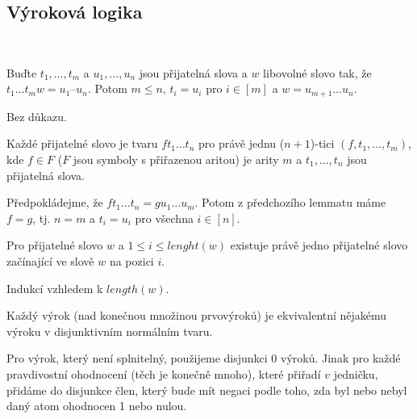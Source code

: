 \documentclass[12pt]{article}                   %
\begin{document}
    \subsection{Výroková logika}
        \begin{lemma}
            \ \\[-3em]

            \begin{lemmain}
                Buďte $t_1, …, t_m$ a $u_1, …, u_n$ jsou přijatelná slova a $w$ libovolné slovo tak, že $t_1…t_mw=u_1–u_n$. Potom $m ≤ n$, $t_i = u_i$ pro $i \in [m]$ a $w = u_{m+1}…u_n$.

                \begin{dukazin}
                    Bez důkazu.
                \end{dukazin}
            \end{lemmain}

            Každé přijatelné slovo je tvaru $ft_1…t_n$ pro právě jednu ($n+1$)-tici $(f, t_1, …, t_m)$, kde $f \in F$ ($F$ jsou symboly s přiřazenou aritou) je arity $m$ a $t_1, …, t_n$ jsou přijatelná slova.

            \begin{dukazin}
                Předpokládejme, že $ft_1…t_n = gu_1…u_m$. Potom z předchozího lemmatu máme $f = g$, tj. $n = m$ a $t_i = u_i$ pro všechna $i \in [n]$.
            \end{dukazin}

            \begin{lemmain}
                Pro přijatelné slovo $w$ a $1≤i≤lenght(w)$ existuje právě jedno přijatelné slovo začínající ve slově $w$ na pozici $i$.

                \begin{dukazin}
                    Indukcí vzhledem k $length(w)$.
                \end{dukazin}
            \end{lemmain}
        \end{lemma}

        \begin{tvrzeni}
            Každý výrok (nad konečnou množinou prvovýroků) je ekvivalentní nějakému výroku v disjunktivním normálním tvaru.

            \begin{dukazin}
                Pro výrok, který není splnitelný, použijeme disjunkci 0 výroků. Jinak pro každé pravdivostní ohodnocení (těch je konečně mnoho), které přiřadí $v$ jedničku, přidáme do disjunkce člen, který bude mít negaci podle toho, zda byl nebo nebyl daný atom ohodnocen 1 nebo nulou.
            \end{dukazin}
        \end{tvrzeni}
\end{document}
